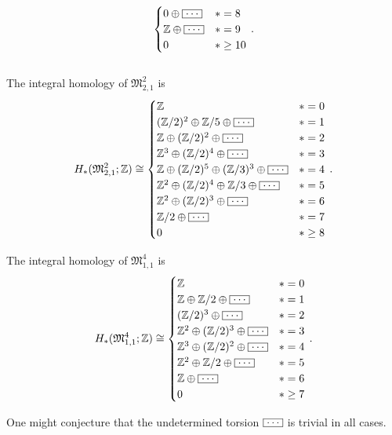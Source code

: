 \begin{thm*}
\[\begin{cases}
                0  \oplus \bldots               & \ast = 8\\
                \mathbb Z  \oplus \bldots       & \ast = 9\\
                0                               & \ast \ge 10\\
            \end{cases}\,.
    \]
    \\[2pt]
    \noindent The integral homology of $\mathfrak M_{2,1}^2$ is
    \[
        H_\ast( \mathfrak{M}_{2,1}^2; \mathbb Z ) \cong 
        \begin{cases}
            \mathbb Z           & \ast = 0\\
            (\mathbb Z/2)^2 \oplus \mathbb Z/5 \oplus \bldots    & \ast = 1\\
            \mathbb Z \oplus (\mathbb Z/2)^2 \oplus \bldots      & \ast = 2\\
            \mathbb Z^3 \oplus (\mathbb Z/2)^4 \oplus \bldots    & \ast = 3\\
            \mathbb Z \oplus (\mathbb Z/2)^5 \oplus (\mathbb Z/3)^3 \oplus \bldots       & \ast = 4\\
            \mathbb Z^2 \oplus (\mathbb Z/2)^4 \oplus \mathbb Z/3 \oplus \bldots         & \ast = 5\\
            \mathbb Z^2 \oplus (\mathbb Z/2)^3 \oplus \bldots    & \ast = 6\\
            \mathbb Z/2 \oplus \bldots                           & \ast = 7\\
            0                   & \ast \ge 8\\
        \end{cases} \,.
    \]
    
    \noindent The integral homology of $\mathfrak M_{1,1}^4$ is
    \[
        H_\ast( \mathfrak{M}_{1,1}^4; \mathbb Z ) \cong 
        \begin{cases}
            \mathbb Z           & \ast = 0\\
            \mathbb Z \oplus \mathbb Z/2 \oplus \bldots          & \ast = 1\\
            (\mathbb Z/2)^3 \oplus \bldots                       & \ast = 2\\
            \mathbb Z^2 \oplus (\mathbb Z/2)^3 \oplus \bldots    & \ast = 3\\
            \mathbb Z^3 \oplus (\mathbb Z/2)^2 \oplus \bldots    & \ast = 4\\
            \mathbb Z^2 \oplus \mathbb Z/2 \oplus \bldots        & \ast = 5\\
            \mathbb Z \oplus \bldots     & \ast = 6\\
            0                           & \ast \ge 7\\
        \end{cases} \,.
    \]
\end{thm*}
One might conjecture that the undetermined torsion $\bldots$ is trivial in all cases.

